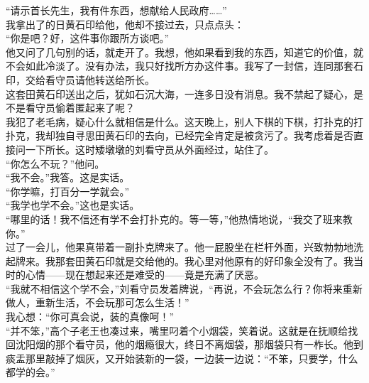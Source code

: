 “请示首长先生，我有件东西，想献给人民政府……”\\

我拿出了的日黄石印给他，他却不接过去，只点点头：\\

“你是吧？好，这件事你跟所方谈吧。”\\

他又问了几句别的话，就走开了。我想，他如果看到我的东西，知道它的价值，就不会如此冷淡了。没有办法，我只好找所方办这件事。我写了一封信，连同那套石印，交给看守员请他转送给所长。\\

这套田黄石印送出之后，犹如石沉大海，一连多日没有消息。我不禁起了疑心，是不是看守员偷着匿起来了呢？\\

我犯了老毛病，疑心什么就相信是什么。这天晚上，别人下棋的下棋，打扑克的打扑克，我却独自寻思田黄石印的去向，已经完全肯定是被贪污了。我考虑着是否直接问一下所长。这时矮墩墩的刘看守员从外面经过，站住了。\\

“你怎么不玩？”他问。\\

“我不会。”我答。这是实话。\\

“你学嘛，打百分一学就会。”\\

“我学也学不会。”这也是实话。\\

“哪里的话！我不信还有学不会打扑克的。等一等，”他热情地说，“我交了班来教你。”\\

过了一会儿，他果真带着一副扑克牌来了。他一屁股坐在栏杆外面，兴致勃勃地洗起牌来。我那套田黄石印就是交给他的。我心里对他原有的好印象全没有了。我当时的心情——现在想起来还是难受的——竟是充满了厌恶。\\

“我就不相信这个学不会，”刘看守员发着牌说，“再说，不会玩怎么行？你将来重新做人，重新生活，不会玩那可怎么生活！”\\

我心想：“你可真会说，装的真像呵！”\\

“并不笨，”高个子老王也凑过来，嘴里叼着个小烟袋，笑着说。这就是在抚顺给找回沈阳烟的那个看守员，他的烟瘾很大，终日不离烟袋，那烟袋只有一柞长。他到痰盂那里敲掉了烟灰，又开始装新的一袋，一边装一边说：“不笨，只要学，什么都学的会。”\\

